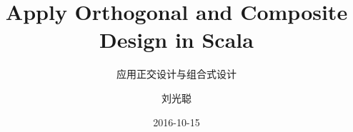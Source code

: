 \title[正交设计 \& 组合式设计]
{Apply Orthogonal and Composite Design in Scala}

\subtitle{应用正交设计与组合式设计}

\author[刘光聪] 
{ 刘光聪%
}


\date[2016.10]{2016-10-15}